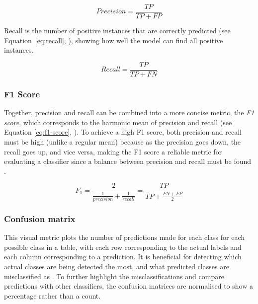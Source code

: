 \begin{equation}
\label{eq:precision}
    Precision = \frac{TP}{TP+FP}
\end{equation}

Recall is the number of positive instances that are correctly predicted (see Equation~\ref{eq:recall}, \cite{Liu2009}), showing how well the model can find all positive instances.

\begin{equation}
\label{eq:recall}
    Recall = \frac{TP}{TP+FN}
\end{equation}

\subsubsection{F1 Score}

Together, precision and recall can be combined into a more concise metric, the \textit{F1 score}, which corresponds to the harmonic mean of precision and recall (see Equation \ref{eq:f1-score}, \cite{Geron2019}). To achieve a high F1 score, both precision and recall must be high (unlike a regular mean) because as the precision goes down, the recall goes up, and vice versa, making the F1 score a reliable metric for evaluating a classifier since a balance between precision and recall must be found \citep{Geron2019}.

\begin{equation}
\label{eq:f1-score}
    F_{1} = \frac{2}{\frac{1}{precision} + \frac{1}{recall}} = \frac{TP}{TP+\frac{FN + FP}{2}}
\end{equation}

\subsubsection{Confusion matrix} 

This visual metric plots the number of predictions made for each class for each possible class in a table, with each row corresponding to the actual labels and each column corresponding to a prediction. It is beneficial for detecting which actual classes are being detected the most, and what predicted classes are misclassified as \citep{Bhardwaj2015, Liu2009}. To further highlight the misclassifications and compare predictions with other classifiers, the confusion matrices are normalised to show a percentage rather than a count.



